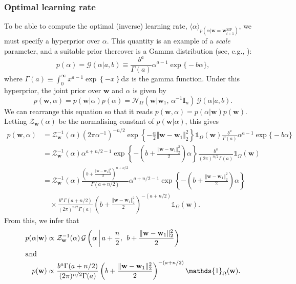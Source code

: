 \subsubsection{Optimal learning rate}

To be able to compute the optimal (inverse) learning rate, $\langle\alpha\rangle_{p(\alpha|\mathbf{w}=\mathbf{w}_{t+1}^\text{MP})}$, we must specify a hyperprior over $\alpha$. This quantity is an example of a \emph{scale} parameter, and a suitable prior thereover is a Gamma distribution (see, e.g., \citep{berger85}):
\begin{equation}
\label{eq:beta-hyperprior}
	p(\alpha) = \mathcal{G}(\alpha|a,b)
	\equiv \frac{b^{a}}{\Gamma(a)}\alpha^{a-1}\exp\big\{-b\alpha\big\},
\end{equation}
where $\Gamma(a) \equiv \int_{0}^{\infty} x^{a-1}\exp\left\{-x\right\}\mathrm{d}x$ is the gamma function. Under this hyperprior, the joint prior over $\mathbf{w}$ and $\alpha$ is given by
\begin{equation}
	p(\mathbf{w}, \alpha)
	= p(\mathbf{w}|\alpha)p(\alpha)
	= \mathcal{N}_{\Omega}(\mathbf{w}|\mathbf{w}_1, \, \alpha^{-1}\mathbf{I}_n)\,\mathcal{G}(\alpha|a,b).
\end{equation}
We can rearrange this equation so that it reads $p(\mathbf{w}, \alpha) = p(\alpha|\mathbf{w})p(\mathbf{w})$. Letting $\mathcal{Z}_{\mathbf{w}}(\alpha)$ be the normalising constant of $p(\mathbf{w}|\alpha)$, this gives
\begin{align}
	p(\mathbf{w}, \alpha)
	&= \mathcal{Z}_{\mathbf{w}}^{-1}(\alpha)
	(2\pi\alpha^{-1})^{-n/2}\exp\left\{-\frac{\alpha}{2}\Vert\mathbf{w}- \mathbf{w}_1\Vert_2^2\right\}\mathds{1}_{\Omega}(\mathbf{w})\frac{b^{a}}{\Gamma(a)}\alpha^{a-1}\exp\big\{-b\alpha\big\}
	\nonumber \\
	&= \mathcal{Z}_{\mathbf{w}}^{-1}(\alpha)\alpha^{a+n/2-1}\exp\left\{-\left(b + \frac{\Vert\mathbf{w}-\mathbf{w}_1\Vert_2^2}{2}\right)\alpha\right\}\frac{b^{a}}{(2\pi)^{n/2}\Gamma(a)}\mathds{1}_{\Omega}(\mathbf{w})
	\nonumber \\
	&= \mathcal{Z}_{\mathbf{w}}^{-1}(\alpha)\frac{\left(b + \frac{\Vert\mathbf{w}-\mathbf{w}_1\Vert_2^2}{2}\right)^{a+n/2}}{\Gamma(a+n/2)}\alpha^{a+n/2-1}\exp\left\{-\left(b + \frac{\Vert\mathbf{w}-\mathbf{w}_1\Vert_2^2}{2}\right)\alpha\right\}
	\nonumber \\
	& \quad \times \frac{b^{a}\Gamma(a+n/2)}{(2\pi)^{n/2}\Gamma(a)}\left(b + \frac{\Vert\mathbf{w}-\mathbf{w}_1\Vert_2^2}{2}\right)^{-\left(a+n/2\right)}\mathds{1}_{\Omega}(\mathbf{w}).
\end{align}
From this, we infer that
\begin{align}
	p(\alpha|\mathbf{w})
	&\propto \mathcal{Z}_{\mathbf{w}}^{-1}(\alpha)\,\mathcal{G}\left(\alpha \, \bigg| \, a + \frac{n}{2},\;\, b + \frac{\Vert\mathbf{w}-\mathbf{w}_1\Vert_2^2}{2}\right)
	\label{eq:conditional-alpha-prior} \\
\intertext{and}
	p(\mathbf{w})
	&\propto \frac{b^{a}\Gamma(a+n/2)}{(2\pi)^{n/2}\Gamma(a)}\left(b + \frac{\Vert\mathbf{w}-\mathbf{w}_1\Vert_2^2}{2}\right)^{-\left(a+n/2\right)}\mathds{1}_{\Omega}(\mathbf{w}).
\end{align}

